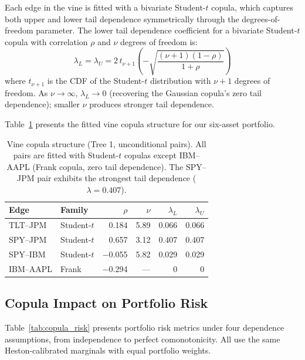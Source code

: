 \documentclass[11pt,a4paper]{article}
\begin{document}
Each edge in the vine is fitted with a bivariate Student-$t$ copula, which captures both upper and lower tail dependence symmetrically through the degrees-of-freedom parameter.
The lower tail dependence coefficient for a bivariate Student-$t$ copula with correlation $\rho$ and $\nu$ degrees of freedom is:
\begin{equation}
\label{eq:lambda_t}
\lambda_L = \lambda_U = 2\,t_{\nu+1}\!\left(-\sqrt{\frac{(\nu+1)(1-\rho)}{1+\rho}}\right)
\end{equation}
where $t_{\nu+1}$ is the CDF of the Student-$t$ distribution with $\nu + 1$ degrees of freedom.
As $\nu \to \infty$, $\lambda_L \to 0$ (recovering the Gaussian copula's zero tail dependence); smaller $\nu$ produces stronger tail dependence.

Table~\ref{tab:vine} presents the fitted vine copula structure for our six-asset portfolio.

\begin{table}[H]
\centering
\caption{Vine copula structure (Tree 1, unconditional pairs). All pairs are fitted with Student-$t$ copulas except IBM--AAPL (Frank copula, zero tail dependence). The SPY--JPM pair exhibits the strongest tail dependence ($\lambda = 0.407$).}
\label{tab:vine}
\small
\begin{tabular}{@{}llrrrr@{}}
\toprule
\textbf{Edge} & \textbf{Family} & \textbf{$\rho$} & \textbf{$\nu$} & $\lambda_L$ & $\lambda_U$ \\
\midrule
TLT--JPM  & Student-$t$ & 0.184 & 5.89 & 0.066 & 0.066 \\
SPY--JPM  & Student-$t$ & 0.657 & 3.12 & 0.407 & 0.407 \\
SPY--IBM  & Student-$t$ & $-$0.055 & 5.82 & 0.029 & 0.029 \\
IBM--AAPL & Frank       & $-$0.294 & ---  & 0     & 0     \\
\bottomrule
\end{tabular}
\end{table}

\subsection{Copula Impact on Portfolio Risk}
\label{sec:copula_results}

Table~\ref{tab:copula_risk} presents portfolio risk metrics under four dependence assumptions, from independence to perfect comonotonicity.
All use the same Heston-calibrated marginals with equal portfolio weights.
\end{document}
